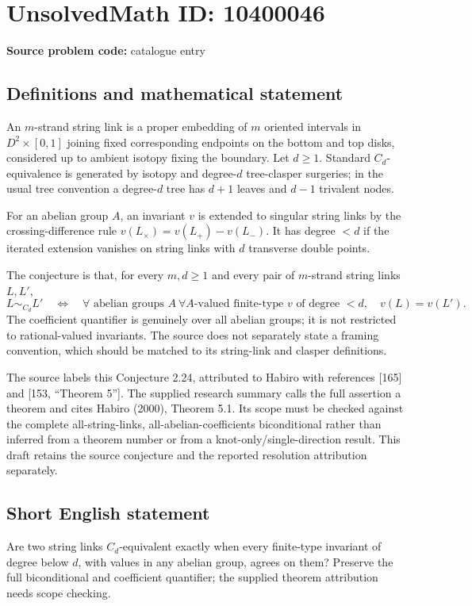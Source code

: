\documentclass[11pt]{article}
\begin{document}
\section*{UnsolvedMath ID: 10400046}
\textbf{Source problem code:} catalogue entry
\subsection{Definitions and mathematical statement}
An $m$-strand string link is a proper embedding of $m$ oriented intervals in $D^2\times[0,1]$ joining fixed corresponding endpoints on the bottom and top disks, considered up to ambient isotopy fixing the boundary. Let $d\geq1$. Standard $C_d$-equivalence is generated by isotopy and degree-$d$ tree-clasper surgeries; in the usual tree convention a degree-$d$ tree has $d+1$ leaves and $d-1$ trivalent nodes.

For an abelian group $A$, an invariant $v$ is extended to singular string links by the crossing-difference rule $v(L_\times)=v(L_+)-v(L_-)$. It has degree $<d$ if the iterated extension vanishes on string links with $d$ transverse double points.

The conjecture is that, for every $m,d\geq1$ and every pair of $m$-strand string links $L,L'$,
\[
L\sim_{C_d}L'
\quad\Longleftrightarrow\quad
\forall\text{ abelian groups }A\ \forall A\text{-valued finite-type }v
\text{ of degree }<d,\quad v(L)=v(L').
\]
The coefficient quantifier is genuinely over all abelian groups; it is not restricted to rational-valued invariants. The source does not separately state a framing convention, which should be matched to its string-link and clasper definitions.

The source labels this Conjecture 2.24, attributed to Habiro with references [165] and [153, ``Theorem 5'']. The supplied research summary calls the full assertion a theorem and cites Habiro (2000), Theorem 5.1. Its scope must be checked against the complete all-string-links, all-abelian-coefficients biconditional rather than inferred from a theorem number or from a knot-only/single-direction result. This draft retains the source conjecture and the reported resolution attribution separately.
\subsection{Short English statement}
Are two string links $C_d$-equivalent exactly when every finite-type invariant of degree below $d$, with values in any abelian group, agrees on them? Preserve the full biconditional and coefficient quantifier; the supplied theorem attribution needs scope checking.
\end{document}
